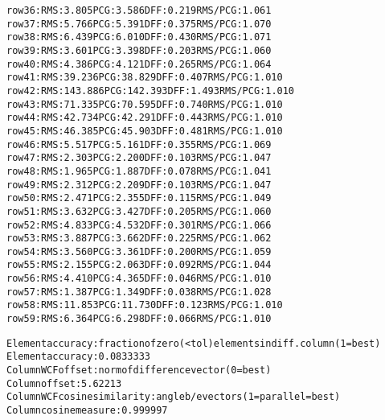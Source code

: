 \begin{alltt}
row  36:  RMS:   3.805    PCG:   3.586    DFF:   0.219    RMS/PCG:   1.061    
row  37:  RMS:   5.766    PCG:   5.391    DFF:   0.375    RMS/PCG:   1.070    
row  38:  RMS:   6.439    PCG:   6.010    DFF:   0.430    RMS/PCG:   1.071    
row  39:  RMS:   3.601    PCG:   3.398    DFF:   0.203    RMS/PCG:   1.060    
row  40:  RMS:   4.386    PCG:   4.121    DFF:   0.265    RMS/PCG:   1.064    
row  41:  RMS:  39.236    PCG:  38.829    DFF:   0.407    RMS/PCG:   1.010    
row  42:  RMS: 143.886    PCG: 142.393    DFF:   1.493    RMS/PCG:   1.010    
row  43:  RMS:  71.335    PCG:  70.595    DFF:   0.740    RMS/PCG:   1.010    
row  44:  RMS:  42.734    PCG:  42.291    DFF:   0.443    RMS/PCG:   1.010    
row  45:  RMS:  46.385    PCG:  45.903    DFF:   0.481    RMS/PCG:   1.010    
row  46:  RMS:   5.517    PCG:   5.161    DFF:   0.355    RMS/PCG:   1.069    
row  47:  RMS:   2.303    PCG:   2.200    DFF:   0.103    RMS/PCG:   1.047    
row  48:  RMS:   1.965    PCG:   1.887    DFF:   0.078    RMS/PCG:   1.041    
row  49:  RMS:   2.312    PCG:   2.209    DFF:   0.103    RMS/PCG:   1.047    
row  50:  RMS:   2.471    PCG:   2.355    DFF:   0.115    RMS/PCG:   1.049    
row  51:  RMS:   3.632    PCG:   3.427    DFF:   0.205    RMS/PCG:   1.060    
row  52:  RMS:   4.833    PCG:   4.532    DFF:   0.301    RMS/PCG:   1.066    
row  53:  RMS:   3.887    PCG:   3.662    DFF:   0.225    RMS/PCG:   1.062    
row  54:  RMS:   3.560    PCG:   3.361    DFF:   0.200    RMS/PCG:   1.059    
row  55:  RMS:   2.155    PCG:   2.063    DFF:   0.092    RMS/PCG:   1.044    
row  56:  RMS:   4.410    PCG:   4.365    DFF:   0.046    RMS/PCG:   1.010    
row  57:  RMS:   1.387    PCG:   1.349    DFF:   0.038    RMS/PCG:   1.028    
row  58:  RMS:  11.853    PCG:  11.730    DFF:   0.123    RMS/PCG:   1.010    
row  59:  RMS:   6.364    PCG:   6.298    DFF:   0.066    RMS/PCG:   1.010    

Element accuracy: fraction of zero (<tol) elements in diff. column (1=best)
Element accuracy:  0.0833333
Column WCF offset: norm of difference vector (0=best)
Column offset:  5.62213
Column WCF cosine similarity: angle b/e vectors (1=parallel=best)
Column cosine measure:  0.999997
\end{alltt}

